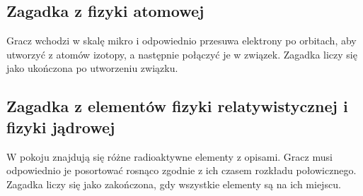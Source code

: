 \subsection{Zagadka z fizyki atomowej}
Gracz wchodzi w skalę mikro i odpowiednio przesuwa elektrony po orbitach, aby utworzyć z atomów izotopy, a następnie połączyć je w związek. Zagadka liczy się jako ukończona po utworzeniu związku.

\subsection{Zagadka z elementów fizyki relatywistycznej i fizyki jądrowej}
W pokoju znajdują się różne radioaktywne elementy z opisami. Gracz musi odpowiednio je posortować rosnąco zgodnie z ich czasem rozkładu połowicznego. Zagadka liczy się jako zakończona, gdy wszystkie elementy są na ich miejscu. 


